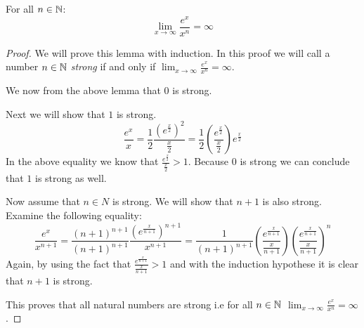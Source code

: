 \begin{proposition}
	For all $n \in \mathbb{N}$: 
	\[
		\lim_{x \rightarrow \infty} \frac{e^{x}}{x^{n}} = \infty
	\]
\end{proposition}

\begin{proof}
	We will prove this lemma with induction. In this proof we will call a number
	$n \in \mathbb{N}$ \emph{strong} if and only if
	$\lim_{x \rightarrow \infty} \frac{e^{x}}{x^{n}} = \infty$.
	
	We now from the above lemma that $0$ is strong.
	
	Next we will show that $1$ is strong.
	\[
		\frac{e^{x}}{x} =%
		\frac{1}{2}\frac{\left(e^{\frac{x}{2}}\right)^2}{\frac{x}{2}} =%
		\frac{1}{2}\left(\frac{e^{\frac{x}{2}}}{\frac{x}{2}}\right)e^{\frac{x}{2}}
	\]
	In the above equality we know that 
	$\frac{e^{\frac{x}{2}}}{\frac{x}{2}} > 1$. Because $0$ is strong we can
	conclude that $1$ is strong as well.
	
	Now assume that $n \in N$ is strong. We will show that $n+1$ is also strong.
	Examine the following equality:
	\[
		\frac{e^{x}}{x^{n+1}} =%
		\frac{(n+1)^{n+1}}{(n+1)^{n+1}}%
		\frac{\left(e^{\frac{x}{n+1}}\right)^{n+1}}{x^{n+1}} =%
		\frac{1}{(n+1)^{n+1}}%
		\left(\frac{e^{\frac{x}{n+1}}}{\frac{x}{n+1}}\right)%
		\left(\frac{e^{\frac{x}{n+1}}}{\frac{x}{n+1}}\right)^{n}%
	\]
	Again, by using the fact that $\frac{e^{\frac{x}{n+1}}}{\frac{x}{n+1}} > 1$
	and with the induction hypothese it is clear that $n+1$ is strong.
	
	This proves that all natural numbers are strong i.e for all $n \in \mathbb{N}$
	$\lim_{x \rightarrow \infty} \frac{e^{x}}{x^{n}} = \infty$.
\end{proof}
